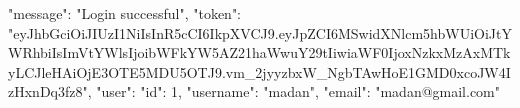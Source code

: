 {
  "message": "Login successful",
  "token": "eyJhbGciOiJIUzI1NiIsInR5cCI6IkpXVCJ9.eyJpZCI6MSwidXNlcm5hbWUiOiJtYWRhbiIsImVtYWlsIjoibWFkYW5AZ21haWwuY29tIiwiaWF0IjoxNzkxMzAxMTkyLCJleHAiOjE3OTE5MDU5OTJ9.vm_2jyyzbxW_NgbTAwHoE1GMD0xcoJW4IzHxnDq3fz8",
  "user": {
    "id": 1,
    "username": "madan",
    "email": "madan@gmail.com"
  }
}